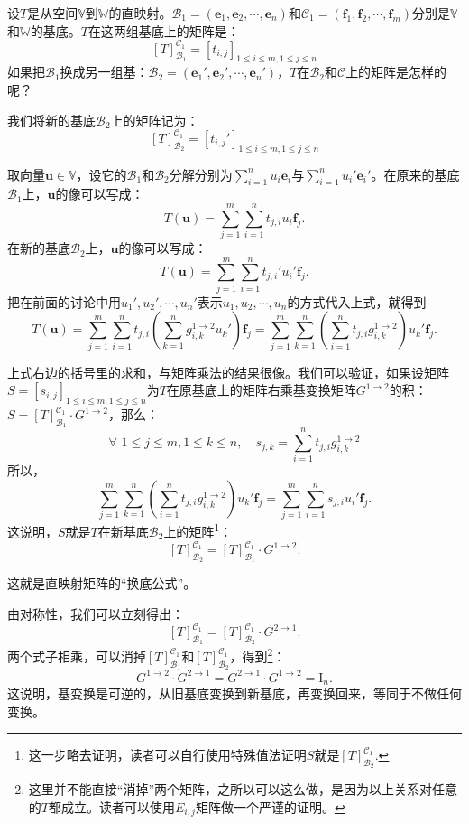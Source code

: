 \documentclass[12pt,UTF8]{ctexbook}
\begin{document}
设$T$是从空间$\mathbb{V}$到$\mathbb{W}$的直映射。$\mathcal{B}_1 = (\mathbf{e}_1, \mathbf{e}_2, \cdots, \mathbf{e}_n)$和$\mathcal{C}_1 = (\mathbf{f}_1, \mathbf{f}_2, \cdots, \mathbf{f}_m)$分别是$\mathbb{V}$和$\mathbb{W}$的基底。$T$在这两组基底上的矩阵是：
$$[T]_{\mathcal{B}_1}^{\mathcal{C}_1} = [t_{i, j}]_{1\leqslant i \leqslant m, 1\leqslant j \leqslant n}$$
如果把$\mathcal{B}_1$换成另一组基：$\mathcal{B}_2 = (\mathbf{e}_1', \mathbf{e}_2', \cdots, \mathbf{e}_n')$，$T$在$\mathcal{B}_2$和$\mathcal{C}$上的矩阵是怎样的呢？

我们将新的基底$\mathcal{B}_2$上的矩阵记为：
$$[T]_{\mathcal{B}_2}^{\mathcal{C}_1} = [t_{i, j}']_{1\leqslant i \leqslant m, 1\leqslant j \leqslant n}$$

取向量$\mathbf{u} \in \mathbb{V}$，设它的$\mathcal{B}_1$和$\mathcal{B}_2$分解分别为$\sum_{i=1}^n u_i\mathbf{e}_i $与$\sum_{i=1}^n u_i'\mathbf{e}_i' $。在原来的基底$\mathcal{B}_1$上，$\mathbf{u}$的像可以写成：
$$T(\mathbf{u}) = \sum_{j=1}^m \sum_{i=1}^n t_{j,i} u_i \mathbf{f}_j.$$
在新的基底$\mathcal{B}_2$上，$\mathbf{u}$的像可以写成：
$$T(\mathbf{u}) = \sum_{j=1}^m \sum_{i=1}^n t_{j,i}' u_i' \mathbf{f}_j.$$
把在前面的讨论中用$u_1', u_2', \cdots, u_n'$表示$u_1, u_2, \cdots, u_n$的方式代入上式，就得到
$$T(\mathbf{u}) = \sum_{j=1}^m \sum_{i=1}^n t_{j,i}\left(\sum_{k=1}^n g_{i,k}^{1\rightarrow 2} u_k'\right) \mathbf{f}_j = \sum_{j=1}^m \sum_{k=1}^n \left(\sum_{i=1}^n t_{j,i} g_{i,k}^{1\rightarrow 2}\right) u_k' \mathbf{f}_j.$$

上式右边的括号里的求和，与矩阵乘法的结果很像。我们可以验证，如果设矩阵$S = [s_{i, j}]_{1\leqslant i \leqslant m, 1\leqslant j \leqslant n}$为$T$在原基底上的矩阵右乘基变换矩阵$G^{1\rightarrow 2}$的积：$S = [T]_{\mathcal{B}_1}^{\mathcal{C}_1} \cdot G^{1\rightarrow 2}$，那么：
$$\forall \,\,1\leqslant j \leqslant m, 1\leqslant k \leqslant n, \quad s_{j, k} = \sum_{i=1}^n t_{j,i} g_{i,k}^{1\rightarrow 2}$$
所以，
$$\sum_{j=1}^m \sum_{k=1}^n \left(\sum_{i=1}^n t_{j,i} g_{i,k}^{1\rightarrow 2}\right) u_k' \mathbf{f}_j = \sum_{j=1}^m \sum_{i=1}^n s_{j,i} u_i' \mathbf{f}_j.$$
这说明，$S$就是$T$在新基底$\mathcal{B}_2$上的矩阵\footnote{这一步略去证明，读者可以自行使用特殊值法证明$S$就是$[T]_{\mathcal{B}_2}^{\mathcal{C}_1}$.}：
$$[T]_{\mathcal{B}_2}^{\mathcal{C}_1} = [T]_{\mathcal{B}_1}^{\mathcal{C}_1} \cdot G^{1\rightarrow 2}.$$

这就是直映射矩阵的“换底公式”。

由对称性，我们可以立刻得出：
$$[T]_{\mathcal{B}_1}^{\mathcal{C}_1} = [T]_{\mathcal{B}_2}^{\mathcal{C}_1} \cdot G^{2\rightarrow 1}.$$
两个式子相乘，可以消掉$[T]_{\mathcal{B}_1}^{\mathcal{C}_1}$和$[T]_{\mathcal{B}_2}^{\mathcal{C}_1}$，得到\footnote{这里并不能直接“消掉”两个矩阵，之所以可以这么做，是因为以上关系对任意的$T$都成立。读者可以使用$E_{i,j}$矩阵做一个严谨的证明。}：
$$G^{1\rightarrow 2} \cdot G^{2\rightarrow 1} = G^{2\rightarrow 1} \cdot G^{1\rightarrow 2} = \mathrm{I}_n.$$
这说明，基变换是可逆的，从旧基底变换到新基底，再变换回来，等同于不做任何变换。
\end{document}
